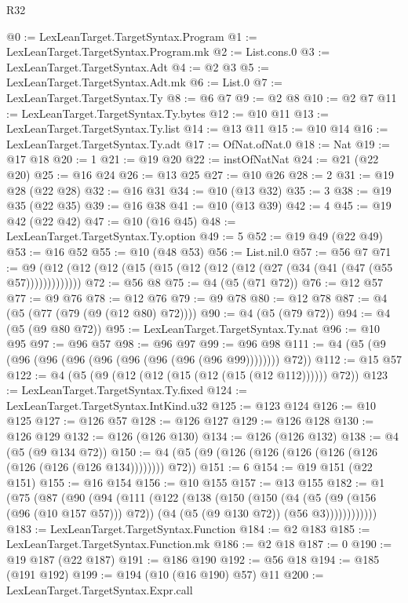 \begin{lexlean}{R32}
\begin{coremodule}
@0 := LexLeanTarget.TargetSyntax.Program
@1 := LexLeanTarget.TargetSyntax.Program.mk
@2 := List.cons.{0}
@3 := LexLeanTarget.TargetSyntax.Adt
@4 := @2 @3
@5 := LexLeanTarget.TargetSyntax.Adt.mk
@6 := List.{0}
@7 := LexLeanTarget.TargetSyntax.Ty
@8 := @6 @7
@9 := @2 @8
@10 := @2 @7
@11 := LexLeanTarget.TargetSyntax.Ty.bytes
@12 := @10 @11
@13 := LexLeanTarget.TargetSyntax.Ty.list
@14 := @13 @11
@15 := @10 @14
@16 := LexLeanTarget.TargetSyntax.Ty.adt
@17 := OfNat.ofNat.{0}
@18 := Nat
@19 := @17 @18
@20 := 1
@21 := @19 @20
@22 := instOfNatNat
@24 := @21 (@22 @20)
@25 := @16 @24
@26 := @13 @25
@27 := @10 @26
@28 := 2
@31 := @19 @28 (@22 @28)
@32 := @16 @31
@34 := @10 (@13 @32)
@35 := 3
@38 := @19 @35 (@22 @35)
@39 := @16 @38
@41 := @10 (@13 @39)
@42 := 4
@45 := @19 @42 (@22 @42)
@47 := @10 (@16 @45)
@48 := LexLeanTarget.TargetSyntax.Ty.option
@49 := 5
@52 := @19 @49 (@22 @49)
@53 := @16 @52
@55 := @10 (@48 @53)
@56 := List.nil.{0}
@57 := @56 @7
@71 := @9 (@12 (@12 (@12 (@15 (@15 (@12 (@12 (@12 (@27 (@34 (@41 (@47 (@55 @57)))))))))))))
@72 := @56 @8
@75 := @4 (@5 (@71 @72))
@76 := @12 @57
@77 := @9 @76
@78 := @12 @76
@79 := @9 @78
@80 := @12 @78
@87 := @4 (@5 (@77 (@79 (@9 (@12 @80) @72))))
@90 := @4 (@5 (@79 @72))
@94 := @4 (@5 (@9 @80 @72))
@95 := LexLeanTarget.TargetSyntax.Ty.nat
@96 := @10 @95
@97 := @96 @57
@98 := @96 @97
@99 := @96 @98
@111 := @4 (@5 (@9 (@96 (@96 (@96 (@96 (@96 (@96 (@96 (@96 @99)))))))) @72))
@112 := @15 @57
@122 := @4 (@5 (@9 (@12 (@12 (@15 (@12 (@15 (@12 @112)))))) @72))
@123 := LexLeanTarget.TargetSyntax.Ty.fixed
@124 := LexLeanTarget.TargetSyntax.IntKind.u32
@125 := @123 @124
@126 := @10 @125
@127 := @126 @57
@128 := @126 @127
@129 := @126 @128
@130 := @126 @129
@132 := @126 (@126 @130)
@134 := @126 (@126 @132)
@138 := @4 (@5 (@9 @134 @72))
@150 := @4 (@5 (@9 (@126 (@126 (@126 (@126 (@126 (@126 (@126 (@126 @134)))))))) @72))
@151 := 6
@154 := @19 @151 (@22 @151)
@155 := @16 @154
@156 := @10 @155
@157 := @13 @155
@182 := @1
    (@75
      (@87
        (@90
          (@94
            (@111
              (@122
                (@138
                  (@150
                    (@150
                      (@4
                        (@5 (@9 (@156 (@96 (@10 @157 @57))) @72))
                        (@4 (@5 (@9 @130 @72)) (@56 @3))))))))))))
@183 := LexLeanTarget.TargetSyntax.Function
@184 := @2 @183
@185 := LexLeanTarget.TargetSyntax.Function.mk
@186 := @2 @18
@187 := 0
@190 := @19 @187 (@22 @187)
@191 := @186 @190
@192 := @56 @18
@194 := @185 (@191 @192)
@199 := @194 (@10 (@16 @190) @57) @11
@200 := LexLeanTarget.TargetSyntax.Expr.call

\end{coremodule}
\end{lexlean}
